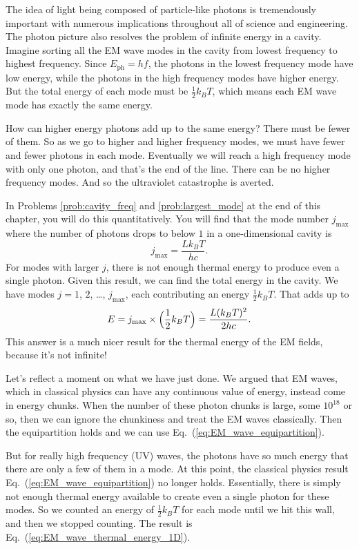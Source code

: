 The idea of light being composed of particle-like photons is tremendously
important with numerous implications throughout all of science and
engineering.  The photon picture also resolves the problem of infinite
energy in a cavity.  Imagine sorting all the EM wave modes in the cavity
from lowest frequency to highest frequency.  Since $E_\text{ph}=hf$,
the photons in the lowest frequency mode have low energy, while the
photons in the high frequency modes have higher energy.  But the total
energy of each mode must be $\textstyle{\frac{1}{2}}k_B T$, which means each EM wave
mode has exactly the same energy.

How can higher energy photons add up to the same energy?  There must
be fewer of them.  So as we go to higher and higher frequency modes,
we must have fewer and fewer photons in each mode.  Eventually we will
reach a high frequency mode with only one photon, and that's the end
of the line.  There can be no higher frequency modes.  And so the
ultraviolet catastrophe is averted.

In Problems \ref{prob:cavity_freq} and \ref{prob:largest_mode}
at the end of this chapter, you will do this quantitatively. You will find
that the mode number $j_\text{max}$ where the number of photons drops to below
$1$ in a one-dimensional cavity is
\begin{equation}
j_\text{max} =  \frac{L k_B T}{h c}.
\label{eq:jmax}
\end{equation}
For modes with larger $j$, there is not enough thermal energy to produce
even a single photon. 
Given this result, we can find the total energy in the cavity.  We have modes $j=1$,
$2$, \dots, $j_\text{max}$, each contributing an energy
$\textstyle{\frac{1}{2}}k_BT$.  That adds up to
\begin{equation}
E =  j_\text{max}\times \Bigl(\frac{1}{2}k_BT\Bigr) = \frac{L (k_BT)^2}{2hc}.
\label{eq:EM_wave_thermal_energy_1D}
\end{equation}
This answer is a much nicer result for the thermal energy of the EM
fields, because it's not infinite!

Let's reflect a moment on what we have just done.  We argued that EM
waves, which in classical physics can have any continuous value of
energy, instead come in energy chunks.  When the number of these
photon chunks is large, some $10^{18}$ or so, then we can ignore the
chunkiness and treat the EM waves classically.  Then the equipartition
holds and we can use
Eq.~(\ref{eq:EM_wave_equipartition}). 

But for really high frequency (UV) waves, the photons have so much
energy that there are only a few of them in a mode.  At this point,
the classical physics result Eq.~(\ref{eq:EM_wave_equipartition}) 
no longer holds.  Essentially, there is simply not enough thermal
energy available to create even a single photon for these modes.
So we counted an energy of $\textstyle{\frac{1}{2}}k_BT$ for each mode until
we hit this wall, and then we stopped counting.  The result is 
Eq.~(\ref{eq:EM_wave_thermal_energy_1D}).

